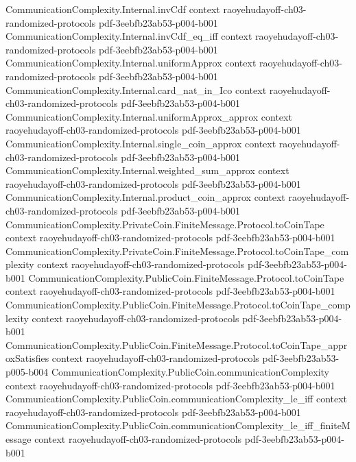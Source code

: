 \begin{theorem}
  {CommunicationComplexity.Internal.invCdf}
  {context}
  {raoyehudayoff-ch03-randomized-protocols}
  {pdf-3eebfb23ab53-p004-b001}
\proofstep
  {CommunicationComplexity.Internal.invCdf_eq_iff}
  {context}
  {raoyehudayoff-ch03-randomized-protocols}
  {pdf-3eebfb23ab53-p004-b001}
\proofstep
  {CommunicationComplexity.Internal.uniformApprox}
  {context}
  {raoyehudayoff-ch03-randomized-protocols}
  {pdf-3eebfb23ab53-p004-b001}
\proofstep
  {CommunicationComplexity.Internal.card_nat_in_Ico}
  {context}
  {raoyehudayoff-ch03-randomized-protocols}
  {pdf-3eebfb23ab53-p004-b001}
\proofstep
  {CommunicationComplexity.Internal.uniformApprox_approx}
  {context}
  {raoyehudayoff-ch03-randomized-protocols}
  {pdf-3eebfb23ab53-p004-b001}
\proofstep
  {CommunicationComplexity.Internal.single_coin_approx}
  {context}
  {raoyehudayoff-ch03-randomized-protocols}
  {pdf-3eebfb23ab53-p004-b001}
\proofstep
  {CommunicationComplexity.Internal.weighted_sum_approx}
  {context}
  {raoyehudayoff-ch03-randomized-protocols}
  {pdf-3eebfb23ab53-p004-b001}
\proofstep
  {CommunicationComplexity.Internal.product_coin_approx}
  {context}
  {raoyehudayoff-ch03-randomized-protocols}
  {pdf-3eebfb23ab53-p004-b001}
\proofstep
  {CommunicationComplexity.PrivateCoin.FiniteMessage.Protocol.toCoinTape}
  {context}
  {raoyehudayoff-ch03-randomized-protocols}
  {pdf-3eebfb23ab53-p004-b001}
\proofstep
  {CommunicationComplexity.PrivateCoin.FiniteMessage.Protocol.toCoinTape_complexity}
  {context}
  {raoyehudayoff-ch03-randomized-protocols}
  {pdf-3eebfb23ab53-p004-b001}
\proofstep
  {CommunicationComplexity.PublicCoin.FiniteMessage.Protocol.toCoinTape}
  {context}
  {raoyehudayoff-ch03-randomized-protocols}
  {pdf-3eebfb23ab53-p004-b001}
\proofstep
  {CommunicationComplexity.PublicCoin.FiniteMessage.Protocol.toCoinTape_complexity}
  {context}
  {raoyehudayoff-ch03-randomized-protocols}
  {pdf-3eebfb23ab53-p004-b001}
\proofstep
  {CommunicationComplexity.PublicCoin.FiniteMessage.Protocol.toCoinTape_approxSatisfies}
  {context}
  {raoyehudayoff-ch03-randomized-protocols}
  {pdf-3eebfb23ab53-p005-b004}
\proofstep
  {CommunicationComplexity.PublicCoin.communicationComplexity}
  {context}
  {raoyehudayoff-ch03-randomized-protocols}
  {pdf-3eebfb23ab53-p004-b001}
\proofstep
  {CommunicationComplexity.PublicCoin.communicationComplexity_le_iff}
  {context}
  {raoyehudayoff-ch03-randomized-protocols}
  {pdf-3eebfb23ab53-p004-b001}
\proofstep
  {CommunicationComplexity.PublicCoin.communicationComplexity_le_iff_finiteMessage}
  {context}
  {raoyehudayoff-ch03-randomized-protocols}
  {pdf-3eebfb23ab53-p004-b001}

\end{theorem}
